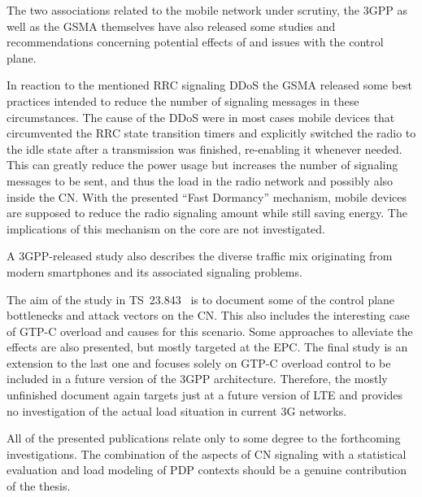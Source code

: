 The two associations related to the mobile network under scrutiny, the \gls{3GPP} as well as the \gls{GSMA} themselves have also released some studies and recommendations concerning potential effects of and issues with the control plane. 

In reaction to the mentioned \gls{RRC} signaling \gls{DDoS} the \gls{GSMA} released some best practices \cite{gsma2011fdbestpract} intended to reduce the number of signaling messages in these circumstances. The cause of the \gls{DDoS} were in most cases mobile devices that circumvented the \gls{RRC} state transition timers and explicitly switched the radio to the idle state after a transmission was finished, re-enabling it whenever needed. This can greatly reduce the power usage but increases the number of signaling messages to be sent, and thus the load in the radio network and possibly also inside the \gls{CN}. With the presented ``Fast Dormancy'' mechanism, mobile devices are supposed to reduce the radio signaling amount while still saving energy. The implications of this mechanism on the core are not investigated.

A \gls{3GPP}-released study \cite{3gpp.22.801} also describes the diverse traffic mix originating from modern smartphones and its associated signaling problems.

The aim of the study in \gls{TS}~23.843~\cite{3gpp.23.843} is to document some of the control plane bottlenecks and attack vectors on the \gls{CN}. This also includes the interesting case of \gls{GTP-C} overload and causes for this scenario. Some approaches to alleviate the effects are also presented, but mostly targeted at the \gls{EPC}. The final study is an extension to the last one \cite{3gpp.29.807} and focuses solely on \gls{GTP-C} overload control to be included in a future version of the \gls{3GPP} architecture. Therefore, the mostly unfinished document again targets just at a future version of \gls{LTE} and provides no investigation of the actual load situation in current \gls{3G} networks.

All of the presented publications relate only to some degree to the forthcoming investigations. The combination of the aspects of \gls{CN} signaling with a statistical evaluation and load modeling of \gls{PDP} contexts should be a genuine contribution of the thesis.



